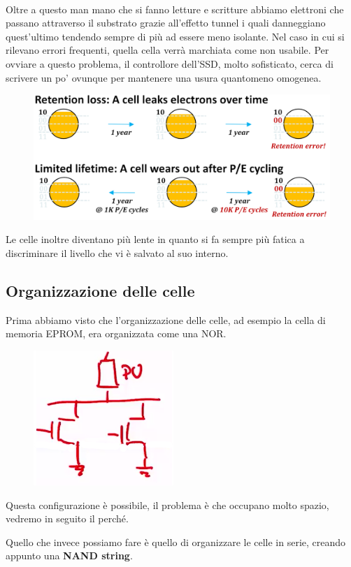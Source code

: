\paragraph{}
Oltre a questo man mano che si fanno letture e scritture abbiamo elettroni che passano attraverso il substrato grazie all'effetto tunnel i quali danneggiano quest'ultimo tendendo sempre di più ad essere meno isolante. Nel caso in cui si rilevano errori frequenti, quella cella verrà marchiata come non usabile. Per ovviare a questo problema, il controllore dell'SSD, molto sofisticato, cerca di scrivere un po' ovunque per mantenere una usura quantomeno omogenea.


\begin{figure}[htbp]
    \centering
    \includegraphics[width=0.55\linewidth]{img/mfhg.png}
\end{figure}

Le celle inoltre diventano più lente in quanto si fa sempre più fatica a discriminare il livello che vi è salvato al suo interno.

\subsection{Organizzazione delle celle}

Prima abbiamo visto che l'organizzazione delle celle, ad esempio la cella di memoria EPROM, era organizzata come una NOR.

\begin{figure}[htbp]
    \centering
    \includegraphics[width=0.2\linewidth]{img/sfbdv.png}
\end{figure}

Questa configurazione è possibile, il problema è che occupano molto spazio, vedremo in seguito il perché.

Quello che invece possiamo fare è quello di organizzare le celle in serie, creando appunto una \textbf{NAND string}.

